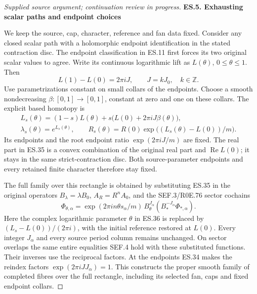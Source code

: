 \begin{proof}[Supplied source argument; continuation review in progress]
\par

\medskip\noindent\textbf{ES.5. Exhausting scalar paths and endpoint choices}

\par\nobreak

We keep the source, cap, character, reference and fan data
fixed. Consider any closed scalar path with a holomorphic
endpoint identification in the stated contraction disc.
The endpoint classification in ES.11 first forces its two
original scalar values to agree. Write its continuous
logarithmic lift as \(L(\theta)\), \(0\le\theta\le1\).
Then
\[
 L(1)-L(0)=2\pi iJ,\qquad J=kJ_0,\quad k\in\mathbb Z.
 \tag{ES.34}
\]
Use parametrizations constant on small collars of the
endpoints. Choose a smooth nondecreasing
\(\beta:[0,1]\to[0,1]\), constant at zero and one on
these collars. The explicit based homotopy is
\[
 \begin{gathered}
 L_s(\theta)=(1-s)L(\theta)
       +s\bigl(L(0)+2\pi iJ\beta(\theta)\bigr),\\
 \lambda_s(\theta)=e^{L_s(\theta)},\qquad
 R_s(\theta)=R(0)
       \exp\bigl((L_s(\theta)-L(0))/m\bigr).
 \end{gathered}\tag{ES.35}
\]
Its endpoints and the root endpoint ratio
\(\exp(2\pi iJ/m)\) are fixed. The real part in ES.35
is a convex combination of the original real part
and \(\operatorname{Re}L(0)\); it stays in the same
strict-contraction disc. Both source-parameter endpoints
and every retained finite character therefore stay fixed.

The full family over this rectangle is obtained by
substituting ES.35 in the original operators
\(B_\lambda=\lambda B_0\), \(A_R=R^nA_0\), and the
SEF.3/R0E.76 sector cochains
\[
 \Phi_{\theta,\alpha}
 =\exp(2\pi in\theta s_\alpha/m)\,
 B_\theta^{J_\alpha}
       (B_*^{-J_\alpha}\Phi_{*,\alpha}).
 \tag{ES.36}
\]
Here the complex logarithmic parameter \(\theta\) in ES.36
is replaced by \((L_s-L(0))/(2\pi i)\), with the initial
reference restored at \(L(0)\). Every integer \(J_\alpha\)
and every source period column remains unchanged. On
sector overlaps the same entire equalities SEF.4 hold
with these substituted functions. Their inverses use
the reciprocal factors. At the endpoints ES.34 makes
the reindex factors \(\exp(2\pi iJJ_\alpha)=1\).
This constructs the proper smooth family of completed
fibres over the full rectangle, including its selected
fan, caps and fixed endpoint collars.


\end{proof}
